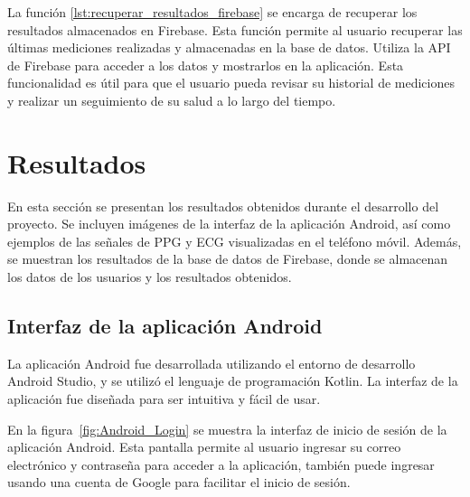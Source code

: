         

        La función \ref{lst:recuperar_resultados_firebase} se encarga de recuperar los resultados almacenados en Firebase. Esta función permite al usuario recuperar las últimas mediciones realizadas y almacenadas en la base de datos. Utiliza la API de Firebase para acceder a los datos y mostrarlos en la aplicación. Esta funcionalidad es útil para que el usuario pueda revisar su historial de mediciones y realizar un seguimiento de su salud a lo largo del tiempo.

        

\newpage

\section{Resultados}

    En esta sección se presentan los resultados obtenidos durante el desarrollo del proyecto. Se incluyen imágenes de la interfaz de la aplicación Android, así como ejemplos de las señales de PPG y ECG visualizadas en el teléfono móvil. Además, se muestran los resultados de la base de datos de Firebase, donde se almacenan los datos de los usuarios y los resultados obtenidos.

    \subsection{Interfaz de la aplicación Android}

    La aplicación Android fue desarrollada utilizando el entorno de desarrollo Android Studio, y se utilizó el lenguaje de programación Kotlin. La interfaz de la aplicación fue diseñada para ser intuitiva y fácil de usar.

    En la figura~\ref{fig:Android_Login} se muestra la interfaz de inicio de sesión de la aplicación Android. Esta pantalla permite al usuario ingresar su correo electrónico y contraseña para acceder a la aplicación, también puede ingresar usando una cuenta de Google para facilitar el inicio de sesión. 

